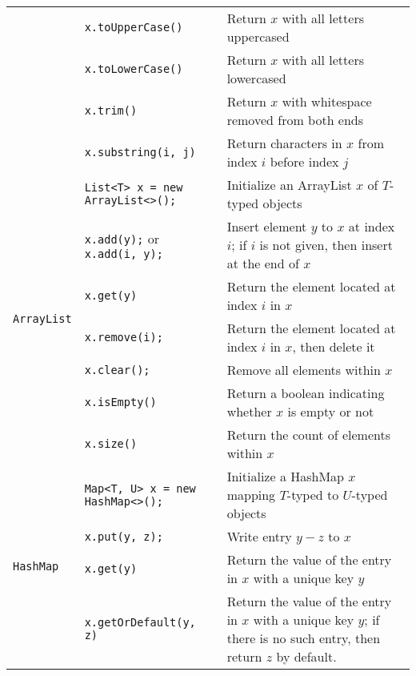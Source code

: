\documentclass{article}
\begin{document}
\begin{center}
\begin{tabularx}{\textwidth}{llX}
                                         & \lstinline|x.toUpperCase()| & Return \(x\) with all letters uppercased\\
                                         & \lstinline|x.toLowerCase()| & Return \(x\) with all letters lowercased\\
                                         & \lstinline|x.trim()| & Return \(x\) with whitespace removed from both ends\\
                                         & \lstinline|x.substring(i, j)| & Return characters in \(x\) from index \(i\) before index \(j\) \\\midrule
  \multirow{7}{*}[-0.5em]{\lstinline|ArrayList|} & \lstinline|List<T> x = new ArrayList<>();| & Initialize an ArrayList \(x\) of \(T\)-typed objects\\
                                         & \lstinline|x.add(y);| or \lstinline|x.add(i, y);| & Insert element \(y\) to \(x\) at index \(i\); if \(i\) is not given, then insert at the end of \(x\)\\
                                         & \lstinline|x.get(y)| & Return the element located at index \(i\) in \(x\) \\
                                         & \lstinline|x.remove(i);| & Return the element located at index \(i\) in \(x\), then delete it\\
                                         & \lstinline|x.clear();| & Remove all elements within \(x\)\\
                                         & \lstinline|x.isEmpty()| & Return a boolean indicating whether \(x\) is empty or not\\
                                         & \lstinline|x.size()| & Return the count of elements within \(x\)\\\midrule
  \multirow{8}{*}[-2em]{\lstinline|HashMap|} & \lstinline|Map<T, U> x = new HashMap<>();| & Initialize a HashMap \(x\) mapping \(T\)-typed to \(U\)-typed objects\\
                                       & \lstinline|x.put(y, z);| & Write entry \(y-z\) to \(x\)\\
                                       & \lstinline|x.get(y)| & Return the value of the entry in \(x\) with a unique key \(y\)\\
                                       & \lstinline|x.getOrDefault(y, z)| & Return the value of the entry in \(x\) with a unique key \(y\); if there is no such entry, then return \(z\) by default.\\

\end{tabularx}
\end{center}
\end{document}
